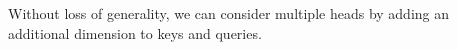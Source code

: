 \documentclass[journal,twoside,web]{ieeecolor}
\DeclareMathOperator*{\argmax}{argmax} %
\begin{document}
Without loss of generality, we can consider multiple heads by adding an additional dimension to keys and queries.



























\end{document}
